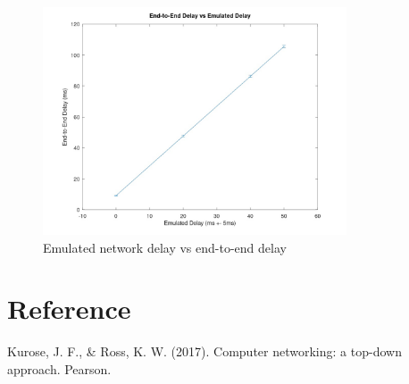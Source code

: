 \documentclass[conference]{IEEEtran}
\begin{document}
\begin{figure}[htp]
    \centering
    \includegraphics[width=9cm]{bibliography/emulated_vs_end-to-end.jpeg}
    \caption{Emulated network delay vs end-to-end delay}
    \label{fig:graph}
\end{figure} 

\section{Reference}
Kurose, J. F., \& Ross, K. W. (2017). Computer networking: a top-down approach. Pearson.
\end{document}
